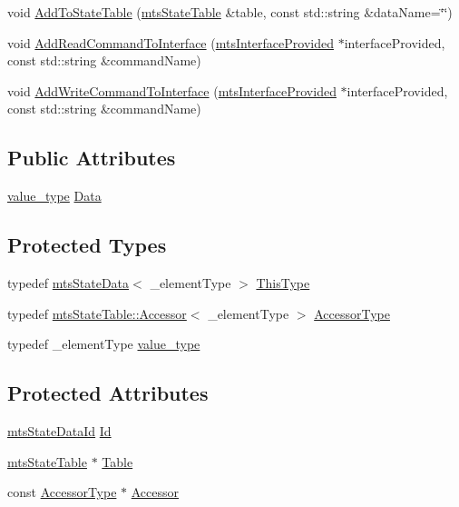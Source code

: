 \begin{DoxyCompactItemize}
void \hyperlink{classmts_state_data_a0c842d51fed06b16cce7da28a0b3ee5b}{Add\+To\+State\+Table} (\hyperlink{classmts_state_table}{mts\+State\+Table} \&table, const std\+::string \&data\+Name=\char`\"{}\char`\"{})
\item 
void \hyperlink{classmts_state_data_ad75f6fd4812170a7c4f8352f73cf2c5d}{Add\+Read\+Command\+To\+Interface} (\hyperlink{classmts_interface_provided}{mts\+Interface\+Provided} $\ast$interface\+Provided, const std\+::string \&command\+Name)
\item 
void \hyperlink{classmts_state_data_a0a840896d80f8ad090700855e18aae9e}{Add\+Write\+Command\+To\+Interface} (\hyperlink{classmts_interface_provided}{mts\+Interface\+Provided} $\ast$interface\+Provided, const std\+::string \&command\+Name)
\end{DoxyCompactItemize}
\subsection*{Public Attributes}
\begin{DoxyCompactItemize}
\item 
\hyperlink{classmts_state_data_aeffdf781c6be5cac19466d4f3d25b3a3}{value\+\_\+type} \hyperlink{classmts_state_data_a3f34dd7340ba9ff2f006a00ca7557f15}{Data}
\end{DoxyCompactItemize}
\subsection*{Protected Types}
\begin{DoxyCompactItemize}
\item 
typedef \hyperlink{classmts_state_data}{mts\+State\+Data}$<$ \+\_\+element\+Type $>$ \hyperlink{classmts_state_data_aaa07d52871cdcbe7388b69bbcf1b114a}{This\+Type}
\item 
typedef \hyperlink{classmts_state_table_1_1_accessor}{mts\+State\+Table\+::\+Accessor}$<$ \+\_\+element\+Type $>$ \hyperlink{classmts_state_data_a21eb9a3d0093820221159ffd63fa9616}{Accessor\+Type}
\item 
typedef \+\_\+element\+Type \hyperlink{classmts_state_data_aeffdf781c6be5cac19466d4f3d25b3a3}{value\+\_\+type}
\end{DoxyCompactItemize}
\subsection*{Protected Attributes}
\begin{DoxyCompactItemize}
\item 
\hyperlink{mts_state_table_8h_ac3a0e34e8991d51790b043fa01857a35}{mts\+State\+Data\+Id} \hyperlink{classmts_state_data_ae5f3c63391a2375ab7f58d1c99bd8521}{Id}
\item 
\hyperlink{classmts_state_table}{mts\+State\+Table} $\ast$ \hyperlink{classmts_state_data_a8933fedc828fdc64dedb258260be5e4a}{Table}
\item 
const \hyperlink{classmts_state_data_a21eb9a3d0093820221159ffd63fa9616}{Accessor\+Type} $\ast$ \hyperlink{classmts_state_data_a41e425be145f2a83a7386a783d3db35c}{Accessor}
\end{DoxyCompactItemize}


